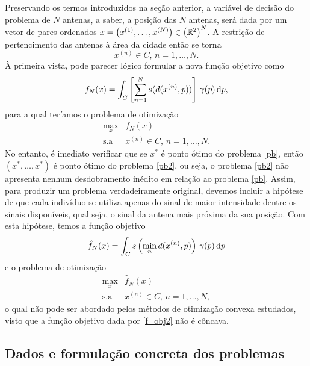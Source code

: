 \documentclass[a4paper,12pt]{article}
\begin{document}
Preservando os termos introduzidos na seção anterior, a variável de decisão do problema de $N$ antenas, a saber, a posição das $N$ antenas, será dada por um vetor de pares ordenados $x = \left(x^{(1)},\dots,x^{(N)}\right) \in \left(\mathbb{R}^2\right)^N$. A restrição de pertencimento das antenas à área da cidade então se torna
\begin{equation*}
	x^{(n)} \in C, \, n = 1, \dots, N .
\end{equation*}
À primeira vista, pode parecer lógico formular a nova função objetivo como
\begin{equation*}
	f_N(x) = \int_C \left[ \sum\limits_{n=1}^N s(d(x^{(n)},p)) \right] \, \gamma(p) \, \text{d}p ,
\end{equation*}
para a qual teríamos o problema de otimização
\begin{equation}
	\label{pb2}
	\begin{array}{rl}
		\max_{x} & f_N(x) \\[0.5ex]
		\text{s.a} & x^{(n)} \in C, \, n = 1, \dots, N .
	\end{array}
	\tag{P2}
\end{equation}
No entanto, é imediato verificar que se $x^*$ é ponto ótimo do problema \eqref{pb}, então $(x^*,\dots,x^*)$ é ponto ótimo do problema \eqref{pb2}, ou seja, o problema \eqref{pb2} não apresenta nenhum desdobramento inédito em relação ao problema \eqref{pb}. Assim, para produzir um problema verdadeiramente original, devemos incluir a hipótese de que cada indivíduo se utiliza apenas do sinal de maior intensidade dentre os sinais disponíveis, qual seja, o sinal da antena mais próxima da sua posição. Com esta hipótese, temos a função objetivo
\begin{equation}
	\label{f_obj2}
	\hat f_N(x) = \int_C s\left( \min_n d(x^{(n)},p) \right) \, \gamma(p) \, \text{d}p 
\end{equation}
e o problema de otimização
\begin{equation}
	\label{pb3}
	\begin{array}{rl}
		\max_{x} & \hat f_N(x) \\[0.5ex]
		\text{s.a} & x^{(n)} \in C, \, n = 1, \dots, N ,
	\end{array}
	\tag{P3}
\end{equation}
o qual não pode ser abordado pelos métodos de otimização convexa estudados, visto que a função objetivo dada por \eqref{f_obj2} não é côncava.

\subsection{Dados e formulação concreta dos problemas}
\end{document}
